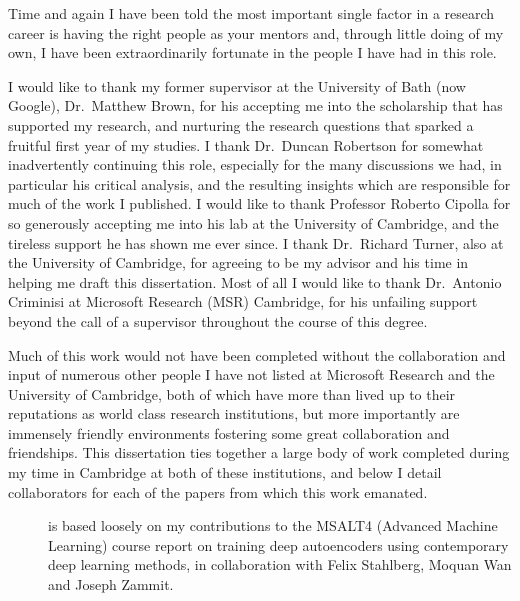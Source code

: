 
\begin{acknowledgements}      

Time and again I have been told the most important single factor in a research career is having the right people as your mentors and, through little doing of my own, I have been extraordinarily fortunate in the people I have had in this role. 

I would like to thank my former supervisor at the University of Bath (now Google), Dr.~Matthew Brown, for his accepting me into the scholarship that has supported my research, and nurturing the research questions that sparked a fruitful first year of my studies. I thank Dr.~Duncan Robertson for somewhat inadvertently continuing this role, especially for the many discussions we had, in particular his critical analysis, and the resulting insights which are responsible for much of the work I published. I would like to thank Professor Roberto Cipolla for so generously accepting me into his lab at the University of Cambridge, and the tireless support he has shown me ever since. I thank Dr.~Richard Turner, also at the University of Cambridge, for agreeing to be my advisor and his time in helping me draft this dissertation. Most of all I would like to thank Dr.~Antonio Criminisi at Microsoft Research (MSR) Cambridge, for his unfailing support beyond the call of a supervisor throughout the course of this degree.

Much of this work would not have been completed without the collaboration and input of numerous other people I have not listed at Microsoft Research and the University of Cambridge, both of which have more than lived up to their reputations as world class research institutions, but more importantly are immensely friendly environments fostering some great collaboration and friendships. This dissertation ties together a large body of work completed during my time in Cambridge at both of these institutions, and below I detail collaborators for each of the papers from which this work emanated.

\begin{description}
	\item[] is based loosely on my contributions to the MSALT4 (Advanced Machine Learning) course report on training deep autoencoders using contemporary deep learning methods, in collaboration with Felix Stahlberg, Moquan Wan and Joseph Zammit.


\end{description}
\end{acknowledgements}
